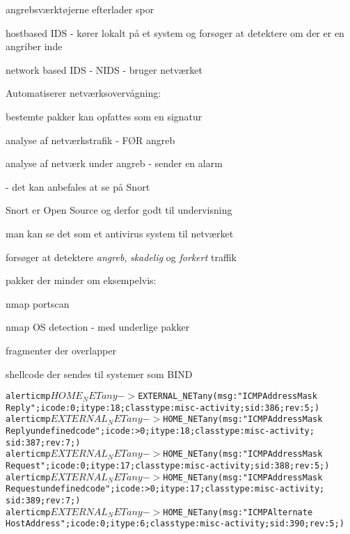 
\begin{list1}
  \item angrebsværktøjerne efterlader spor

\item hostbased IDS - kører lokalt på et system og forsøger at
  detektere om der er en angriber inde
\item network based IDS - NIDS - bruger netværket
\item Automatiserer netværksovervågning:
  \begin{list2}
  \item bestemte pakker kan opfattes som en signatur
\item analyse af netværkstrafik - FØR angreb
\item analyse af netværk under angreb - sender en alarm
  \end{list2}
\item {} - det kan anbefales at se på Snort
\end{list1}



\begin{list1}
\item Snort er Open Source og derfor godt til undervisning
\item man kan se det som et antivirus system til netværket
\item forsøger at detektere \emph{angreb}, \emph{skadelig} og
  \emph{forkert} traffik
\item pakker der minder om eksempelvis:
  \begin{list2}
    \item nmap portscan
\item nmap OS detection - med underlige pakker
\item fragmenter der overlapper
\item shellcode der sendes til systemer som BIND
  \end{list2}
\end{list1}


\begin{alltt}\small
alert icmp $HOME_NET any -> $EXTERNAL_NET any (msg:"ICMP Address Mask
Reply"; icode:0; itype:18; classtype:misc-activity; sid:386; rev:5;)
alert icmp $EXTERNAL_NET any -> $HOME_NET any (msg:"ICMP Address Mask 
Reply undefined code"; icode:>0; itype:18; classtype:misc-activity; 
sid:387; rev:7;)
alert icmp $EXTERNAL_NET any -> $HOME_NET any (msg:"ICMP Address Mask 
Request"; icode:0; itype:17; classtype:misc-activity; sid:388; rev:5;)
alert icmp $EXTERNAL_NET any -> $HOME_NET any (msg:"ICMP Address Mask 
Request undefined code"; icode:>0; itype:17; classtype:misc-activity; 
sid:389; rev:7;)
alert icmp $EXTERNAL_NET any -> $HOME_NET any (msg:"ICMP Alternate 
Host Address"; icode:0; itype:6; classtype:misc-activity; sid:390; rev:5;)
\end{alltt}


